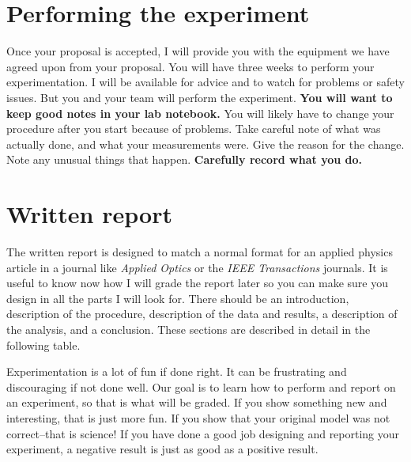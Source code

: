 \documentclass[twoside,11pt,ShortChapTitles]{BYUTextbook}
\begin{document}
\section{Performing the experiment}

Once your proposal is accepted, I will provide you with the equipment we
have agreed upon from your proposal. You will have three weeks to perform
your experimentation. I will be available for advice and to watch for
problems or safety issues. But you and your team will perform the
experiment. \textbf{You will want to keep good notes in your lab notebook.}
You will likely have to change your procedure after you start because of
problems. Take careful note of what was actually done, and what your
measurements were. Give the reason for the change. Note any unusual things
that happen. \textbf{Carefully record what you do.}

\section{Written report}

The written report is designed to match a normal format for an applied
physics article in a journal like \emph{Applied Optics} or the \emph{IEEE
Transactions} journals. It is useful to know now how I will grade
the report later so you can make sure you design in all the parts I will
look for. There should be an introduction, description of the procedure,
description of the data and results, a description of the analysis, and a
conclusion. These sections are described in detail in the following table.

Experimentation is a lot of fun if done right. It can be frustrating and
discouraging if not done well. Our goal is to learn how to perform and
report on an experiment, so that is what will be graded. If you show
something new and interesting, that is just more fun. If you show that your
original model was not correct--that is science! If you have done a good job
designing and reporting your experiment, a negative result is just as good
as a positive result.
\pagebreak
{}
\end{document}
